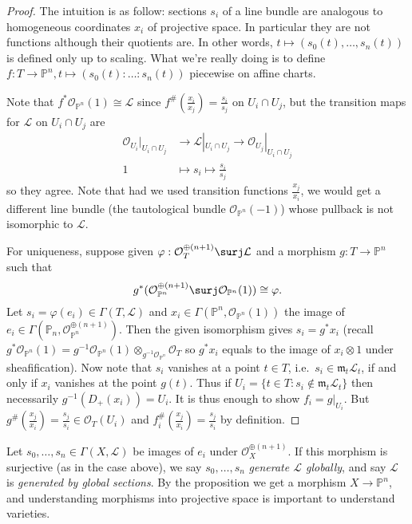 \documentclass[a4paper]{article}
\renewcommand*{\P}{\mathbb{P}}
\newcommand{\sh}[1]{\mathcal{#1}} %
\begin{document}
\begin{proof}
  The intuition is as follow: sections \(s_i\) of a line bundle are analogous to homogeneous coordinates \(x_i\) of projective space. In particular they are not functions although their quotients are. In other words, \(t \mapsto (s_0(t), \dots, s_n(t))\) is defined only up to scaling. What we're really doing is to define \(f: T \to \P^n, t \mapsto (s_0(t): \dots : s_n(t))\) piecewise on affine charts.

  Note that \(f^* \sh O_{\P^n}(1) \cong \sh L\) since \(f^\#(\frac{x_i}{x_j}) = \frac{s_i}{s_j}\) on \(U_i \cap U_j\), but the transition maps for \(\sh L\) on \(U_i \cap U_j\) are
  \begin{align*}
    \sh O_{U_i}|_{U_i \cap U_j} &\to \sh L|_{U_i \cap U_j} \to \sh O_{U_j}|_{U_i \cap U_j} \\
    1 &\mapsto s_i \mapsto \frac{s_i}{s_j}
  \end{align*}
  so they agree. Note that had we used transition functions \(\frac{x_j}{x_i}\), we would get a different line bundle (the tautological bundle \(\sh O_{\P^n}(-1)\)) whose pullback is not isomorphic to \(\sh L\).

  For uniqueness, suppose given \(\varphi: \sh O_T^{\oplus(n + 1)} \surj \sh L\) and a morphism \(g: T \to \P^n\) such that
  \[
    g^*(\sh O_{\P^n}^{\oplus(n + 1)} \surj \sh O_{\P^n}(1)) \cong \varphi.
  \]
  Let \(s_i = \varphi(e_i) \in \Gamma(T, \sh L)\) and \(x_i \in \Gamma(\P^n, \sh O_{\P^n}(1))\) the image of \(e_i \in \Gamma(\P_n, \sh O_{\P^n}^{\oplus(n + 1)})\). Then the given isomorphism gives \(s_i = g^*x_i\) (recall \(g^* \sh O_{\P^n}(1) = g^{-1} \sh O_{\P^n}(1) \otimes_{g^{-1} \sh O_{\P^n}} \sh O_T\) so \(g^*x_i\) equals to the image of \(x_i \otimes 1\) under sheafification). Now note that \(s_i\) vanishes at a point \(t \in T\), i.e.\ \(s_i \in \mathfrak m_t \sh L_t\), if and only if \(x_i\) vanishes at the point \(g(t)\). Thus if \(U_i = \{t \in T: s_i \notin \mathfrak m_t \sh L_t\}\) then necessarily \(g^{-1}(D_+(x_i)) = U_i\). It is thus enough to show \(f_i = g|_{U_i}\). But \(g^\#(\frac{x_j}{x_i}) = \frac{s_j}{s_i} \in \sh O_T(U_i)\) and \(f_i^\#(\frac{x_j}{x_i}) = \frac{s_j}{s_i}\) by definition.
\end{proof}

Let \(s_0, \dots, s_n \in \Gamma(X, \sh L)\) be images of \(e_i\) under \(\sh O_X^{\oplus(n + 1)}\). If this morphism is surjective (as in the case above), we say \(s_0, \dots, s_n\) \emph{generate \(\sh L\) globally}, and say \(\sh L\) is \emph{generated by global sections}. By the proposition we get a morphism \(X \to \P^n\), and understanding morphisms into projective space is important to understand varieties.
\end{document}

